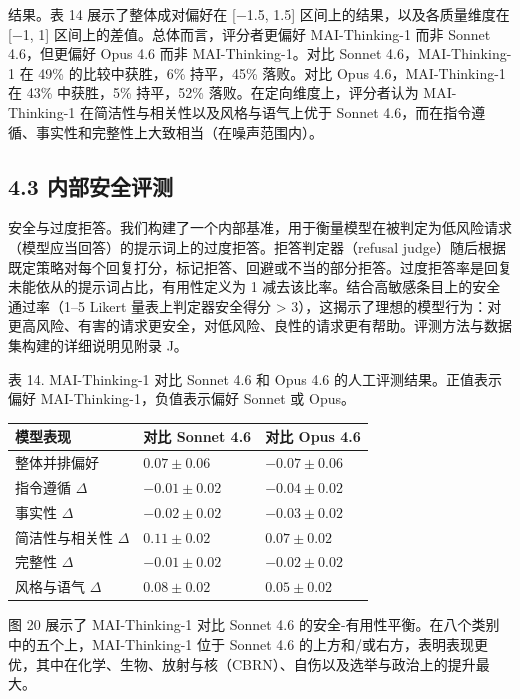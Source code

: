 结果。表 14 展示了整体成对偏好在 {[}−1.5, 1.5{]} 区间上的结果，以及各质量维度在 {[}−1, 1{]} 区间上的差值。总体而言，评分者更偏好 MAI-Thinking-1 而非 Sonnet 4.6，但更偏好 Opus 4.6 而非 MAI-Thinking-1。对比 Sonnet 4.6，MAI-Thinking-1 在 49\% 的比较中获胜，6\% 持平，45\% 落败。对比 Opus 4.6，MAI-Thinking-1 在 43\% 中获胜，5\% 持平，52\% 落败。在定向维度上，评分者认为 MAI-Thinking-1 在简洁性与相关性以及风格与语气上优于 Sonnet 4.6，而在指令遵循、事实性和完整性上大致相当（在噪声范围内）。

\subsection{4.3 内部安全评测}\label{internal-safety-evaluation}

安全与过度拒答。我们构建了一个内部基准，用于衡量模型在被判定为低风险请求（模型应当回答）的提示词上的过度拒答。拒答判定器（refusal judge）随后根据既定策略对每个回复打分，标记拒答、回避或不当的部分拒答。过度拒答率是回复未能依从的提示词占比，有用性定义为 1 减去该比率。结合高敏感条目上的安全通过率（1--5 Likert 量表上判定器安全得分 \textgreater{} 3），这揭示了理想的模型行为：对更高风险、有害的请求更安全，对低风险、良性的请求更有帮助。评测方法与数据集构建的详细说明见附录 J。

表 14. MAI-Thinking-1 对比 Sonnet 4.6 和 Opus 4.6 的人工评测结果。正值表示偏好 MAI-Thinking-1，负值表示偏好 Sonnet 或 Opus。

{\def\LTcaptype{none} %
\begin{longtable}[]{@{}|l|l|l|@{}}
\toprule\noalign{}
\endhead
\bottomrule\noalign{}
\endlastfoot
\hline
模型表现 & 对比 Sonnet 4.6 & 对比 Opus 4.6 \\
\hline
整体并排偏好 & $0.07 \pm 0.06$ & $-0.07 \pm 0.06$ \\
\hline
指令遵循 $\Delta$ & $-0.01 \pm 0.02$ & $-0.04 \pm 0.02$ \\
\hline
事实性 $\Delta$ & $-0.02 \pm 0.02$ & $-0.03 \pm 0.02$ \\
\hline
简洁性与相关性 $\Delta$ & $0.11 \pm 0.02$ & $0.07 \pm 0.02$ \\
\hline
完整性 $\Delta$ & $-0.01 \pm 0.02$ & $-0.02 \pm 0.02$ \\
\hline
风格与语气 $\Delta$ & $0.08 \pm 0.02$ & $0.05 \pm 0.02$ \\
\hline
\end{longtable}
}

图 20 展示了 MAI-Thinking-1 对比 Sonnet 4.6 的安全-有用性平衡。在八个类别中的五个上，MAI-Thinking-1 位于 Sonnet 4.6 的上方和/或右方，表明表现更优，其中在化学、生物、放射与核（CBRN）、自伤以及选举与政治上的提升最大。

